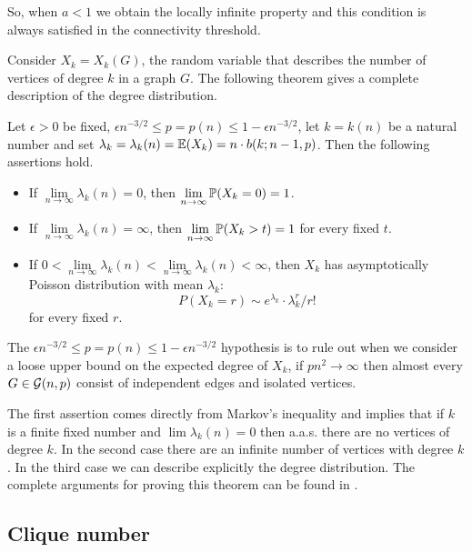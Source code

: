 So, when $a<1$ we obtain the locally infinite property and this condition is always satisfied in the connectivity threshold.

Consider $X_{k} = X_{k} (G)$, the random variable that describes the number of vertices of degree $k$ in a graph $G$. The following theorem gives a complete description of the degree distribution. 

\begin{theorem}\label{degreeTheorem}
Let $\epsilon>0$ be fixed, $\epsilon n^{-3/2} \leq p = p(n) \leq 1 - \epsilon n^{-3/2}$, let $k = k(n)$ be a natural number and set $\lambda_{k} = \lambda_{k}(n) = \E(X_{k}) = n\cdot b(k;n - 1,p)$. Then the following assertions hold.

\begin{itemize}
\item If $\lim\limits_{n\to \infty} \lambda_{k}(n) = 0$, then $\lim\limits_{n\to \infty} \P(X_{k} = 0) = 1$. 
\item If $\lim\limits_{n\to \infty} \lambda_{k}(n) = \infty$, then $\lim\limits_{n\to \infty} \P(X_{k} > t) = 1$
for every fixed $t$.
\item If $0 < \lim\limits_{n\to \infty} \lambda_{k}(n) < \lim\limits_{n\to \infty} \lambda_{k}(n) < \infty$,
then $X_{k}$ has asymptotically Poisson distribution with mean $\lambda_{k}$: 
$$P(X_{k} = r) \sim e^{\lambda_{k}}\cdot \lambda_{k}^{r}/ r!$$
for every fixed $r$.
\end{itemize}
\end{theorem}

The $\epsilon n^{-3/2} \leq p = p(n) \leq 1 - \epsilon n^{-3/2}$ hypothesis is to rule out when we consider a loose upper bound on the expected degree of $X_ {k}$, if $pn^{2} \to \infty $ then almost every $ G \in \G (n, p) $ consist of independent edges and isolated vertices.

The first assertion comes directly from Markov's inequality and implies that if $k$ is a finite fixed number and $\lim \lambda_{k}(n) = 0$ then a.a.s. there are no vertices of degree $k$. In the second case there are an infinite number of vertices with degree $k$. In the third case we can describe explicitly the degree distribution. The complete arguments for proving this theorem can be found in \cite[Bollobás, p.~61]{Bollobas}.

\subsection{Clique number}

